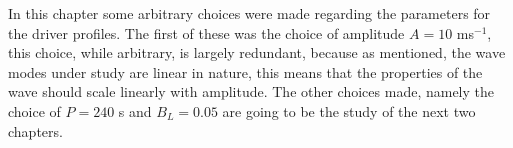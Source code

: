 In this chapter some arbitrary choices were made regarding the parameters for the driver profiles.
The first of these was the choice of amplitude $A=10$ ms$^{-1}$, this choice, while arbitrary, is largely redundant, because as mentioned, the wave modes under study are linear in nature, this means that the properties of the wave should scale linearly with amplitude.
The other choices made, namely the choice of $P=240$ s and $B_L = 0.05$ are going to be the study of the next two chapters.


